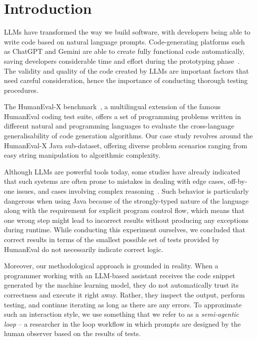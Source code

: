 \documentclass[journal]{IEEEtran}
\begin{document}
\section{Introduction}
\label{sec:intro}

LLMs have transformed the way we build software, with developers being able to write code based on natural language prompts. Code-generating platforms such as ChatGPT and Gemini are able to create fully functional code automatically, saving developers considerable time and effort during the prototyping phase~\cite{yuan2025testctrl}. The validity and quality of the code created by LLMs are important factors that need careful consideration, hence the importance of conducting thorough testing procedures.

The HumanEval-X benchmark~\cite{peng2024humanevalxl}, a multilingual extension of the famous HumanEval coding test suite, offers a set of programming problems written in different natural and programming languages to evaluate the cross-language generalisability of code generation algorithms. Our case study revolves around the HumanEval-X Java sub-dataset, offering diverse problem scenarios ranging from easy string manipulation to algorithmic complexity.

Although LLMs are powerful tools today, some studies have already indicated that such systems are often prone to mistakes in dealing with edge cases, off-by-one issues, and cases involving complex reasoning~\cite{caracciolo2026guidelines}. Such behavior is particularly dangerous when using Java because of the strongly-typed nature of the language along with the requirement for explicit program control flow, which means that one wrong step might lead to incorrect results without producing any exceptions during runtime. While conducting this experiment ourselves, we concluded that correct results in terms of the smallest possible set of tests provided by HumanEval do not necessarily indicate correct logic.

Moreover, our methodological approach is grounded in reality. When a programmer working with an LLM-based assistant receives the code snippet generated by the machine learning model, they do not automatically trust its correctness and execute it right away. Rather, they inspect the output, perform testing, and continue iterating as long as there are any errors. To approximate such an interaction style, we use something that we refer to as a \textit{semi-agentic loop} -- a researcher in the loop workflow in which prompts are designed by the human observer based on the results of tests.
\end{document}
